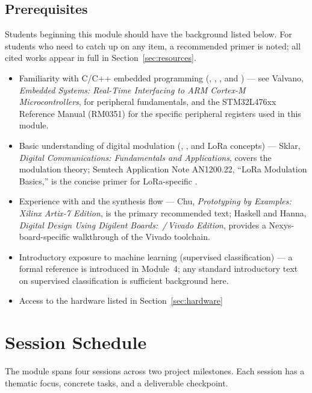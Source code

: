 \documentclass[11pt,letterpaper]{article}
\begin{document}
	\subsection{Prerequisites}
	
	Students beginning this module should have the background listed below. For students who need to catch up on any item, a recommended primer is noted; all cited works appear in full in Section~\ref{sec:resources}.
	\begin{itemize}[leftmargin=2em]
		\item Familiarity with C/C++ embedded programming (\GPIO{}, \SPI{}, \UART{}, and \IIC{}) --- see Valvano, \textit{Embedded Systems: Real-Time Interfacing to ARM Cortex-M Microcontrollers}, for peripheral fundamentals, and the STM32L476xx Reference Manual (RM0351) for the specific peripheral registers used in this module.
		\item Basic understanding of digital modulation (\ASK{}, \FSK{}, and LoRa \CSS{} concepts) --- Sklar, \textit{Digital Communications: Fundamentals and Applications}, covers the modulation theory; Semtech Application Note AN1200.22, ``LoRa Modulation Basics,'' is the concise primer for LoRa-specific \CSS{}.
		
		\newpage
		\item Experience with \VHDL{} and the \FPGA{} synthesis flow --- Chu, \textit{\FPGA{} Prototyping by \VHDL{} Examples: Xilinx Artix-7 Edition}, is the primary recommended text; Haskell and Hanna, \textit{Digital Design Using Digilent \FPGA{} Boards: \VHDL{}\,/\,Vivado Edition}, provides a Nexys-board-specific walkthrough of the Vivado toolchain.
		\item Introductory exposure to machine learning (supervised classification) --- a formal reference is introduced in Module~4; any standard introductory text on supervised classification is sufficient background here.
		\item Access to the hardware listed in Section~\ref{sec:hardware}
	\end{itemize}
	
	\newpage
	\section{Session Schedule}

	The module spans four sessions across two project milestones. Each session has a thematic focus, concrete tasks, and a deliverable checkpoint.
\end{document}
